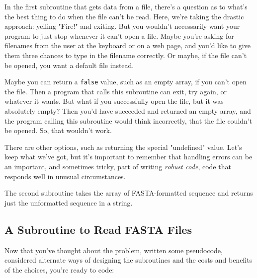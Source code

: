 In the first subroutine that gets data from a file, there's a question as to what's the best thing to do when the file can't be read. Here, we're taking the drastic approach: yelling "Fire!" and exiting. But you wouldn't necessarily want your program to just stop whenever it can't open a file. Maybe you're asking for filenames from the user at the keyboard or on a web page, and you'd like to give them three chances to type in the filename correctly. Or maybe, if the file can't be opened, you want a default file instead.

Maybe you can return a \verb|false| value, such as an empty array, if you can't open the file. Then a program that calls this subroutine can exit, try again, or whatever it wants. But what if you successfully open the file, but it was absolutely empty? Then you'd have succeeded and returned an empty array, and the program calling this subroutine would think incorrectly, that the file couldn't be opened. So, that wouldn't work.

There are other options, such as returning the special "undefined" value. Let's keep what we've got, but it's important to remember that handling errors can be an important, and sometimes tricky, part of writing \textit{robust code}, code that responds well in unusual circumstances.

The second subroutine takes the array of FASTA-formatted sequence and returns just the unformatted sequence in a string. 

\subsection{A Subroutine to Read FASTA Files}
Now that you've thought about the problem, written some pseudocode, considered alternate ways of designing the subroutines and the costs and benefits of the choices, you're ready to code:

